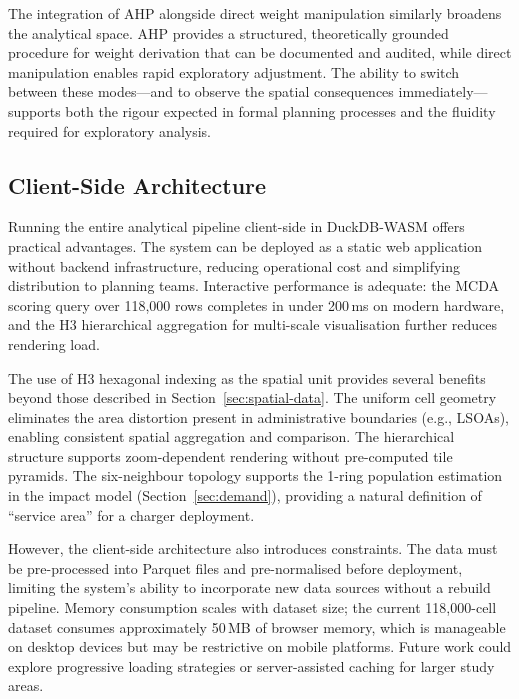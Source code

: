 The integration of AHP alongside direct weight manipulation similarly broadens the analytical space. AHP provides a structured, theoretically grounded procedure for weight derivation that can be documented and audited, while direct manipulation enables rapid exploratory adjustment. The ability to switch between these modes---and to observe the spatial consequences immediately---supports both the rigour expected in formal planning processes and the fluidity required for exploratory analysis.

\subsection{Client-Side Architecture}
\label{sec:disc-architecture}

Running the entire analytical pipeline client-side in DuckDB-WASM offers practical advantages. The system can be deployed as a static web application without backend infrastructure, reducing operational cost and simplifying distribution to planning teams. Interactive performance is adequate: the MCDA scoring query over 118,000 rows completes in under 200\,ms on modern hardware, and the H3 hierarchical aggregation for multi-scale visualisation further reduces rendering load.

The use of H3 hexagonal indexing as the spatial unit provides several benefits beyond those described in Section~\ref{sec:spatial-data}. The uniform cell geometry eliminates the area distortion present in administrative boundaries (e.g., LSOAs), enabling consistent spatial aggregation and comparison. The hierarchical structure supports zoom-dependent rendering without pre-computed tile pyramids. The six-neighbour topology supports the 1-ring population estimation in the impact model (Section~\ref{sec:demand}), providing a natural definition of ``service area'' for a charger deployment.

However, the client-side architecture also introduces constraints. The data must be pre-processed into Parquet files and pre-normalised before deployment, limiting the system's ability to incorporate new data sources without a rebuild pipeline. Memory consumption scales with dataset size; the current 118,000-cell dataset consumes approximately 50\,MB of browser memory, which is manageable on desktop devices but may be restrictive on mobile platforms. Future work could explore progressive loading strategies or server-assisted caching for larger study areas.

